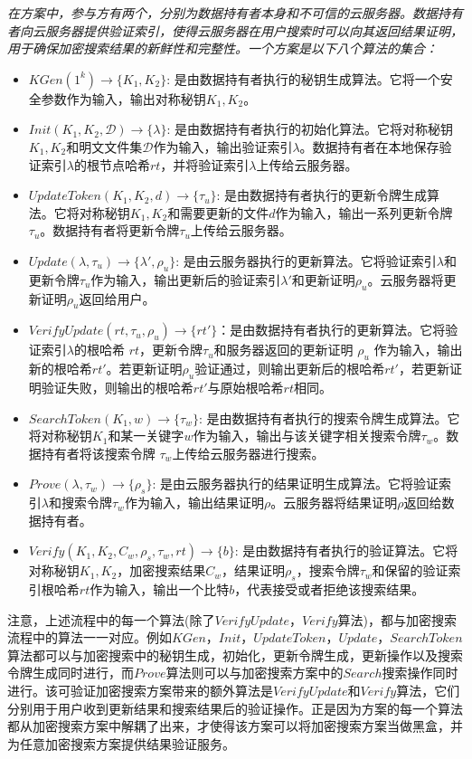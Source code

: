 \begin{definition}\label{def:single}
  {\itshape
      在\single 方案中，参与方有两个，分别为数据持有者本身和不可信的云服务器。数据持有者向云服务器提供验证索引，使得云服务器在用户搜索时可以向其返回结果证明，用于确保加密搜索结果的新鲜性和完整性。一个\single 方案是以下八个算法的集合：
      \begin{itemize}
        \item $KGen(1^k) \rightarrow \{K_1,K_2\}$: 是由数据持有者执行的秘钥生成算法。它将一个安全参数作为输入，输出对称秘钥$K_1,K_2$。
        \item $Init(K_1,K_2, \mathcal{D}) \rightarrow \{\lambda\}$: 是由数据持有者执行的初始化算法。它将对称秘钥$K_1,K_2$和明文文件集$\mathcal{D}$作为输入，输出验证索引$\lambda$。数据持有者在本地保存验证索引$\lambda$的根节点哈希$rt$，并将验证索引$\lambda$上传给云服务器。
        \item $UpdateToken(K_1,K_2, d) \rightarrow \{\tau_u\}$: 是由数据持有者执行的更新令牌生成算法。它将对称秘钥$K_1,K_2$和需要更新的文件$d$作为输入，输出一系列更新令牌$\tau_u$。数据持有者将更新令牌$\tau_u$上传给云服务器。
        \item $Update(\lambda, \tau_u) \rightarrow \{\lambda',\rho_u\}$: 是由云服务器执行的更新算法。它将验证索引$\lambda$和更新令牌$\tau_u$作为输入，输出更新后的验证索引$\lambda'$和更新证明$\rho_u$。云服务器将更新证明$\rho_u$返回给用户。
        \item $VerifyUpdate(rt,\tau_u,\rho_u) \rightarrow \{rt'\}$：是由数据持有者执行的更新算法。它将验证索引$\lambda$的根哈希 $rt$，更新令牌$\tau_u$和服务器返回的更新证明 $\rho_u$ 作为输入，输出新的根哈希$rt'$。若更新证明$\rho_u$验证通过，则输出更新后的根哈希$rt'$，若更新证明验证失败，则输出的根哈希$rt'$与原始根哈希$rt$相同。
        \item $SearchToken(K_1, w) \rightarrow \{\tau_{w}\}$: 是由数据持有者执行的搜索令牌生成算法。它将对称秘钥$K_1$和某一关键字$w$作为输入，输出与该关键字相关搜索令牌$\tau_{w}$。数据持有者将该搜索令牌 $\tau_{w}$上传给云服务器进行搜索。
        \item $Prove(\lambda, \tau_{w}) \rightarrow \{\rho_s\}$: 是由云服务器执行的结果证明生成算法。它将验证索引$\lambda$和搜索令牌$\tau_{w}$作为输入，输出结果证明$\rho$。云服务器将结果证明$\rho$返回给数据持有者。
        \item $Verify(K_1,K_2, C_w, \rho_s,\tau_{w}, rt) \rightarrow \{b\}$: 是由数据持有者执行的验证算法。它将对称秘钥$K_1,K_2$，加密搜索结果$C_w$，结果证明$\rho_s$，搜索令牌$\tau_{w}$和保留的验证索引根哈希$rt$作为输入，输出一个比特$b$，代表接受或者拒绝该搜索结果。
      \end{itemize}
      }
\end{definition}
注意，上述流程中的每一个算法(除了$VerifyUpdate$，$Verify$算法)，都与加密搜索流程中的算法一一对应。例如$KGen$，$Init$，$UpdateToken$，$Update$，$SearchToken$算法都可以与加密搜索中的秘钥生成，初始化，更新令牌生成，更新操作以及搜索令牌生成同时进行，而$Prove$算法则可以与加密搜索方案中的$Search$搜索操作同时进行。该可验证加密搜索方案带来的额外算法是$VerifyUpdate$和$Verify$算法，它们分别用于用户收到更新结果和搜索结果后的验证操作。正是因为\single 方案的每一个算法都从加密搜索方案中解耦了出来，才使得该方案可以将加密搜索方案当做黑盒，并为任意加密搜索方案提供结果验证服务。

